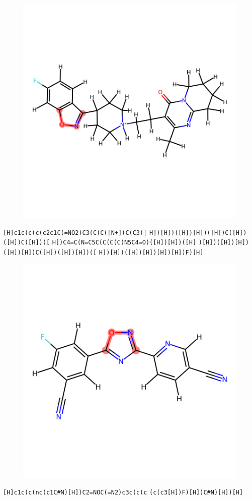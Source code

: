 \documentclass{article}
\begin{document}
\begin{figure}[ht]
\centering
    \includegraphics{mol102.png}
\end{figure}
\verb|[H]c1c(c(c(c2c1C(=NO2)C3(C(C([N+](C(C3([| \verb|H])[H])([H])[H])([H])C([H])([H])C([H])([| \verb|H])C4=C(N=C5C(C(C(C(N5C4=O)([H])[H])([H]| \verb|)[H])([H])[H])([H])[H])C([H])([H])[H])([| \verb|H])[H])([H])[H])[H])[H])F)[H]|

\begin{figure}[ht]
\centering
    \includegraphics{mol103.png}
\end{figure}
\verb|[H]c1c(c(nc(c1C#N)[H])C2=NOC(=N2)c3c(c(c| \verb|(c(c3[H])F)[H])C#N)[H])[H]|
\end{document}
